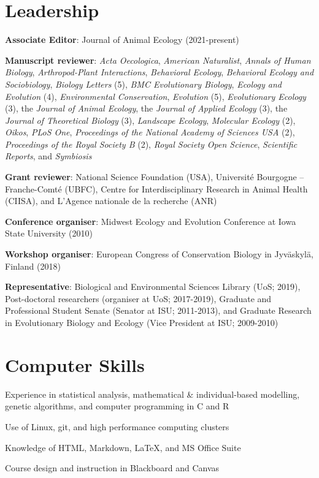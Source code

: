 \documentclass[letterpaper]{article}
\renewenvironment{itemize}{
  \begin{list}{}{
    \setlength{\leftmargin}{1.5em}
  }
}{
  \end{list}
}
\begin{document}
\section*{Leadership}
\begin{itemize}
\item {\bf Associate Editor}: Journal of Animal Ecology (2021-present)
\item {\bf Manuscript reviewer}: {\it Acta Oecologica}, {\it American Naturalist}, {\it Annals of Human Biology}, {\it Arthropod-Plant Interactions}, {\it Behavioral Ecology}, {\it Behavioral Ecology and Sociobiology}, {\it Biology Letters} (5), {\it BMC Evolutionary Biology}, {\it Ecology and Evolution} (4), {\it Environmental Conservation}, {\it Evolution} (5), {\it Evolutionary Ecology} (3), the {\it Journal of Animal Ecology}, the {\it Journal of Applied Ecology} (3), the {\it Journal of Theoretical Biology} (3), {\it Landscape Ecology}, {\it Molecular Ecology} (2), {\it Oikos}, {\it PLoS One}, {\it Proceedings of the National Academy of Sciences USA} (2), {\it Proceedings of the Royal Society B} (2), {\it Royal Society Open Science}, {\it Scientific Reports}, and {\it Symbiosis}
\item {\bf Grant reviewer}: National Science Foundation (USA), Universit\'{e} Bourgogne -- Franche-Comt\'{e} (UBFC), Centre for Interdisciplinary Research in Animal Health (CIISA), and L'Agence nationale de la recherche (ANR)
\item {\bf Conference organiser}: Midwest Ecology and Evolution Conference at Iowa State University (2010)
\item {\bf Workshop organiser}: European Congress of Conservation Biology in Jyv\"{a}skyl\"{a}, Finland (2018)
\item {\bf Representative}: Biological and Environmental Sciences Library (UoS; 2019), Post-doctoral researchers (organiser at UoS; 2017-2019), Graduate and Professional Student Senate (Senator at ISU; 2011-2013), and Graduate Research in Evolutionary Biology and Ecology (Vice President at ISU; 2009-2010)
\end{itemize}

\section*{Computer Skills}
\begin{itemize}
\item Experience in statistical analysis, mathematical \& individual-based modelling, genetic algorithms, and computer programming in C and R %
\item Use of Linux, git, and high performance computing clusters
\item Knowledge of HTML, Markdown, \LaTeX, and MS Office Suite
\item Course design and instruction in Blackboard and Canvas
\end{itemize}
\end{document}
